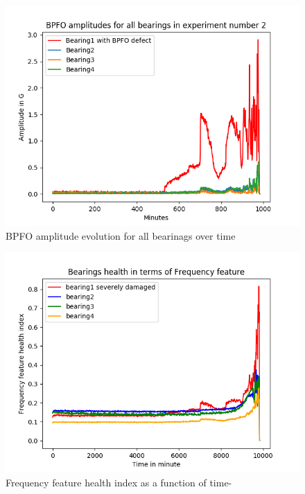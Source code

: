 \documentclass[thesis.tex]{subfiles}
\begin{document}
	\begin{figure}[H] 
		\centering
		\includegraphics[width=5.3in]{../fig/experiment2_bearing_fft_amp.png}
		\caption{BPFO amplitude evolution for all bearinags over time}
		\label{fig:dq1}
	\end{figure}
\begin{figure}[H] %
	\centering
	\includegraphics[width=5.3in]{../fig/frequency_feature_health.png} 
	\caption{Frequency feature health index as a function of time-}
	\label{fig:dq2}
\end{figure}
\end{document}
